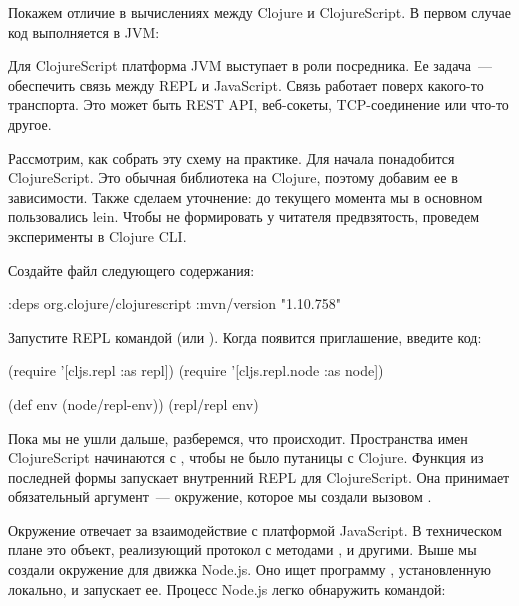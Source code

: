 Покажем отличие в вычислениях между Clojure и ClojureScript. В первом случае код выполняется в JVM:

\begin{figure}[H]
  \centering
  
  \label{fig:chart-repl-03}
\end{figure}

Для ClojureScript платформа JVM выступает в роли посредника. Ее задача~--- обеспечить связь между REPL и JavaScript. Связь работает поверх какого-то транспорта. Это может быть REST API, веб-сокеты, TCP-соединение или что-то другое.

\begin{figure}[H]
  \centering
  
  \label{fig:chart-repl-04}
\end{figure}

Рассмотрим, как собрать эту схему на практике. Для начала понадобится ClojureScript. Это обычная библиотека на Clojure, поэтому добавим ее в зависимости. Также сделаем уточнение: до текущего момента мы в основном пользовались lein. Чтобы не формировать у читателя предвзятость, проведем эксперименты в Clojure CLI.

Создайте файл  следующего содержания:

\begin{english}
  \begin{clojure}
{:deps
 {org.clojure/clojurescript {:mvn/version "1.10.758"}}}
  \end{clojure}
\end{english}

Запустите REPL командой  (или ). Когда появится приглашение, введите код:

\begin{english}
  \begin{clojure}
(require '[cljs.repl :as repl])
(require '[cljs.repl.node :as node])

(def env (node/repl-env))
(repl/repl env)
  \end{clojure}
\end{english}

Пока мы не ушли дальше, разберемся, что происходит. Пространства имен ClojureScript начинаются с , чтобы не было путаницы с Clojure. Функция  из последней формы запускает внутренний REPL для ClojureScript. Она принимает обязательный аргумент~--- окружение, которое мы создали вызовом .

Окружение отвечает за взаимодействие с платформой JavaScript. В техническом плане это объект, реализующий протокол  с методами ,  и другими. Выше мы создали окружение для движка Node.js. Оно ищет программу , установленную локально, и запускает ее. Процесс Node.js легко обнаружить командой:

